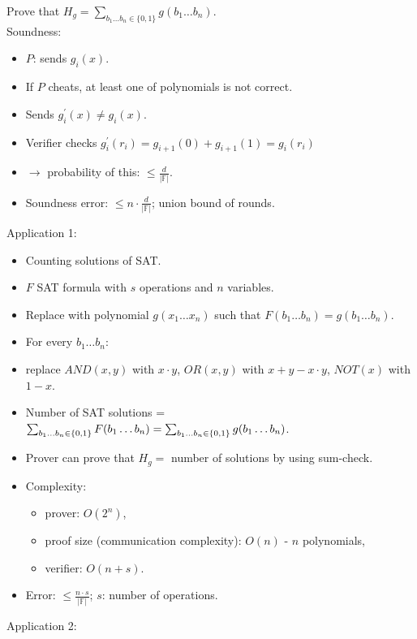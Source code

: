 \documentclass[a4paper, 12pt]{book}
\theoremstyle{definition}
\theoremstyle{remark}
\newcommand{\F}{\mathbb{F}}
\begin{document}
Prove that $H_g = \sum_{b_1 \dots b_n \in \{0, 1\}} g(b_1 \dots b_n)$. \\
Soundness:
\begin{itemize}[label={}]
  \item $P$: sends $g_i(x)$.
  \item If $P$ cheats, at least one of polynomials is not correct.
  \item Sends $g_i^{'}(x) \neq g_i(x)$.
  \item Verifier checks $g_i^{'}(r_i) = g_{i+1}(0) + g_{i+1}(1) = g_i(r_i)$
  \item $\to$ probability of this: $\leq \frac{d}{|\F|}$.
  \item Soundness error: $\leq n \cdot \frac{d}{|\F|}$; union bound of rounds.
\end{itemize}
Application 1:
\begin{itemize}[label={}]
  \item Counting solutions of SAT.
  \item $F$ SAT formula with $s$ operations and $n$ variables.
  \item Replace with polynomial $g(x_1 \dots x_n)$ such that $F(b_1 \dots b_n) = g(b_1 \dots b_n)$.
  \item For every $b_1 \dots b_n$:
  \item replace $AND(x,y)$ with $x \cdot y$, $OR(x,y)$ with $x + y - x \cdot y$, $NOT(x)$ with $1-x$.
  \item Number of SAT solutions = $\sum_{b_1 \dots b_n \in \{0, 1\}} F(b_1 \dots b_n) \\
    = \sum_{b_1 \dots b_n \in \{0, 1\}} g(b_1 \dots b_n)$.
  \item Prover can prove that $H_g =$ number of solutions by using sum-check.
  \item Complexity:
    \begin{itemize}[label={}]
      \item prover: $O\left(2^n\right)$,
      \item proof size (communication complexity): $O(n)$ - $n$ polynomials,
      \item verifier: $O(n + s)$.
    \end{itemize}
  \item Error: $\leq \frac{n \cdot s}{|\F|}$; $s$: number of operations.
\end{itemize}
Application 2:
\end{document}
